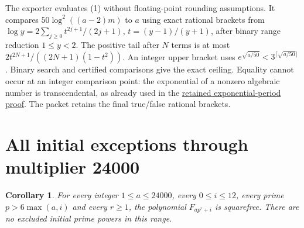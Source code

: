 \documentclass[11pt]{article}
\newtheorem{corollary}[theorem]{Corollary}
\begin{document}
The exporter evaluates (1) without floating-point rounding assumptions.
It compares $50\log^2((a-2)m)$ to $a$ using exact rational brackets
from $\log y=2\sum_{j\ge0}t^{2j+1}/(2j+1)$,
$t=(y-1)/(y+1)$, after binary range reduction $1\le y<2$.
The positive tail after $N$ terms is at most
$2t^{2N+1}/((2N+1)(1-t^2))$. An integer upper bracket uses
$e^{\sqrt{a/50}}<3^{\lceil\sqrt{a/50}\rceil}$.
Binary search and certified comparisons give the exact ceiling.
Equality cannot occur at an integer comparison point: the exponential
of a nonzero algebraic number is transcendental, as already used in the
\href{COUPLED_BLOCK_PERIODS.tex}{retained exponential-period proof}.
The packet retains the final true/false rational brackets.

\section{All initial exceptions through multiplier 24000}
\begin{corollary}\label{cor:bounded-multipliers}
For every integer $1\le a\le24000$, every $0\le i\le12$, every prime
$p>6\max(a,i)$ and every $r\ge1$, the polynomial $F_{ap^r+i}$ is
squarefree. There are no excluded initial prime powers in this range.
\end{corollary}
\end{document}
